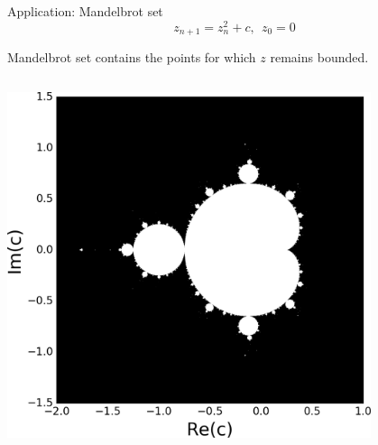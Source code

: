 \documentclass[svgnames]{beamer}
\begin{document}
\begin{frame}{Application: Mandelbrot set}
 \begin{displaymath}
  z_{n+1} = z_n^2+c,\ \ z_0=0
 \end{displaymath}

 Mandelbrot set contains the points for which $z$ remains bounded.

 \begin{columns}
  \begin{column}{0.5\textwidth}
   \begin{center}
    \includegraphics[width=0.8\textwidth]{mandelbrot}


\end{center}
\end{column}
\end{columns}
\end{frame}
\end{document}
